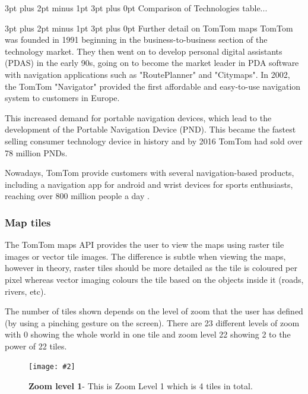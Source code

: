 \documentclass[12pt,a4paper]{article}
\makeatletter
\newcommand{\figuremacro}[5]{
    \begin{figure}[#1]
        \centering
        \texttt{[image: \#2]}
        \caption[#3]{\textbf{#3}#4}
        \label{fig:#2}
    \end{figure}
}
\renewcommand\subsection{\@startsection {subsection}{1}{0mm} %
                               {3pt plus 2pt minus 1pt} %
                               {3pt plus 0pt} %
                               {\normalfont\bfseries}}
\makeatother
\begin{document}
\subsection{Comparison of Technologies}
table...
\begin{table}
  
\end{table}

\subsection{Further detail on TomTom maps}
TomTom was founded in 1991 beginning in the business-to-business section of the technology market. They then went on to develop personal digital assistants (PDAS) in the early 90s, going on to become the market leader in PDA software with navigation applications such as "RoutePlanner" and "Citymaps". In 2002, the TomTom "Navigator" provided the first affordable and easy-to-use navigation system to customers in Europe.

This increased demand for portable navigation devices, which lead to the development of the Portable Navigation Device (PND). This became the fastest selling consumer technology device in history and by 2016 TomTom had sold over 78 million PNDs.

Nowadays, TomTom provide customers with several navigation-based products, including a navigation app for android and wrist devices for sports enthusiasts, reaching over 800 million people a day \cite{TomTomHist}.

\subsubsection{Map tiles}
The TomTom maps API provides the user to view the maps using raster tile images or vector tile images. The difference is subtle when viewing the maps, however in theory, raster tiles should be more detailed as the tile is coloured per pixel whereas vector imaging colours the tile based on the objects inside it (roads, rivers, etc).

The number of tiles shown depends on the level of zoom that the user has defined (by using a pinching gesture on the screen). There are 23 different levels of zoom with 0 showing the whole world in one tile and zoom level 22 showing 2 to the power of 22 tiles. 

\figuremacro{h}{TomTomZoom1}{Zoom level 1}{- This is Zoom Level 1 which is 4 tiles in total.}{1.0} 
\end{document}

